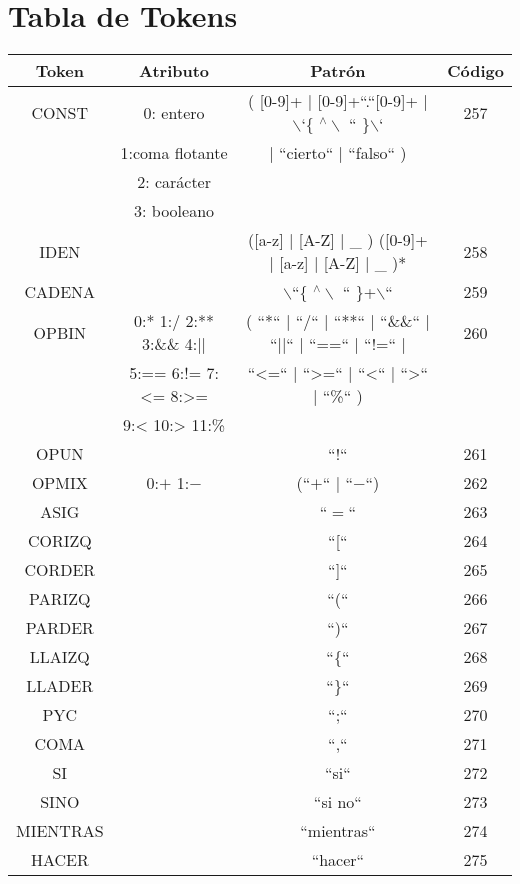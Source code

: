 \newpage
\section{Tabla de Tokens}

\begin{table}[H]
\centering
\small
\begin{tabular}{| c | c | c | c |}
  \hline
  Token & Atributo & Patrón & Código \\ \hline
  CONST & 0: entero & ( [0-9]+ | [0-9]+``.``[0-9]+ | $\backslash$`\{  $^\wedge \backslash$ `` \}$\backslash$`  & 257 \\
  & 1:coma flotante & | ``cierto`` | ``falso`` ) &  \\
  & 2: carácter & & \\
  & 3: booleano &  & \\ \hline
  IDEN & & ([a-z] | [A-Z] | \_ ) ([0-9]+ | [a-z] | [A-Z] | \_ )* & 258 \\ \hline
  CADENA & &  $\backslash$``\{  $^\wedge \backslash$ `` \}+$\backslash$``& 259 \\ \hline
  OPBIN & 0:*  1:/  2:**  3:\&\& 4:|| & ( ``*``  |  ``/``  |  ``**``  |  ``\&\&``  |  ``||`` |  ``==`` |  ``$!$=``  |   & 260 \\
  &   5:== 6:!= 7:\textless{}= 8:>=   & ``\textless{}=``  |  ``\textgreater=``  |  ``\textless`` |  ``\textgreater``  |  ``\%``  )& \\
  & 9:< 10:> 11:\% & & \\ \hline
OPUN & & ``$!$`` &  261 \\ \hline
OPMIX & 0:$+$ 1:$-$ & (``$+$`` | ``$-$``) & 262 \\ \hline
ASIG &  & ``$=$`` & 263 \\ \hline
CORIZQ & & ``[`` & 264 \\ \hline
CORDER & & ``]`` & 265\\ \hline
PARIZQ & & ``(`` & 266\\ \hline
PARDER & & ``)`` & 267\\ \hline
LLAIZQ & & ``\{`` & 268\\ \hline
LLADER & & ``\}`` & 269\\ \hline
PYC & & ``;`` & 270\\ \hline
COMA & & ``,`` & 271\\ \hline
SI & & ``si`` & 272\\ \hline
SINO & & ``si no`` & 273\\ \hline
MIENTRAS & & ``mientras`` & 274\\ \hline
HACER& & ``hacer`` & 275\\ \hline

\end{tabular}
\end{table}
